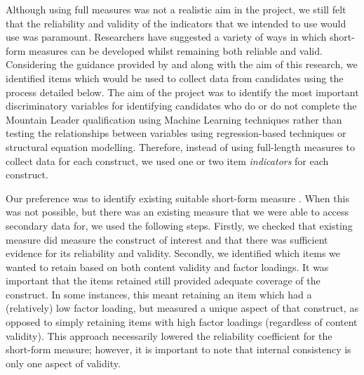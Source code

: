 \documentclass[
  12pt,
  a4paper,
]{book}
\begin{document}
Although using full measures was not a realistic aim in the project, we still felt that the reliability and validity of the indicators that we intended to use would use was paramount. Researchers have suggested a variety of ways in which short-form measures can be developed whilst remaining both reliable and valid. Considering the guidance provided by \citet{Smith2000} and \citet{Horvath2018} along with the aim of this research, we identified items which would be used to collect data from candidates using the process detailed below. The aim of the project was to identify the most important discriminatory variables for identifying candidates who do or do not complete the Mountain Leader qualification using Machine Learning techniques rather than testing the relationships between variables using regression-based techniques or structural equation modelling. Therefore, instead of using full-length measures to collect data for each construct, we used one or two item \emph{indicators} for each construct.

Our preference was to identify existing suitable short-form measure \citep[e.g., the Ten Item Personality Inventory;][]{Gosling2003}. When this was not possible, but there was an existing measure that we were able to access secondary data for, we used the following steps. Firstly, we checked that existing measure did measure the construct of interest and that there was sufficient evidence for its reliability and validity. Secondly, we identified which items we wanted to retain based on both content validity and factor loadings. It was important that the items retained still provided adequate coverage of the construct. In some instances, this meant retaining an item which had a (relatively) low factor loading, but measured a unique aspect of that construct, as opposed to simply retaining items with high factor loadings (regardless of content validity). This approach necessarily lowered the reliability coefficient for the short-form measure; however, it is important to note that internal consistency is only one aspect of validity.
\end{document}
